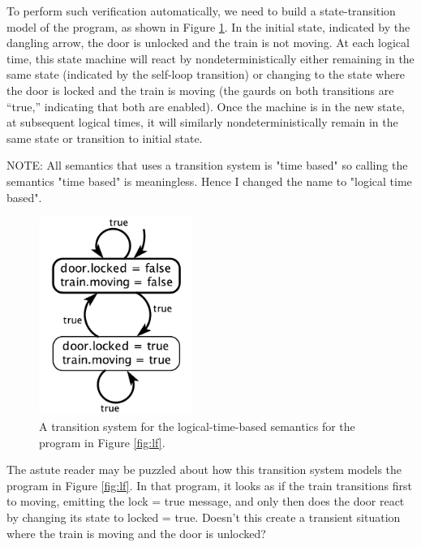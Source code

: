 \documentclass{article}
\begin{document}
To perform such verification automatically, we need to build a state-transition model
of the program, as shown in Figure \ref{fig:logicaltimebased}.
In the initial state, indicated by the dangling arrow, the door is unlocked and the train
is not moving.
At each logical time, this state machine will react by nondeterministically either
remaining in the same state (indicated by the self-loop transition) or changing to the state
where the door is locked and the train is moving
(the gaurds on both transitions are ``true,'' indicating that both are enabled).
Once the machine is in the new state, at subsequent logical times,
it will similarly nondeterministically remain in the same
state or transition to initial state.

NOTE: All semantics that uses a transition system is "time based" so calling the semantics "time based" is meaningless. Hence I changed the name to "logical time based".

\begin{figure}[b]
  \centering
  \includegraphics[width=5cm]{LogicalTimeBased.pdf}
  \caption{A transition system for the logical-time-based semantics for the program in Figure \ref{fig:lf}.
  \label{fig:logicaltimebased}}
\end{figure}

The astute reader may be puzzled about how this transition system models the program
in Figure \ref{fig:lf}. In that program, it looks as if the train transitions first to moving,
emitting the lock = true message, and only then does the door react by changing its state to
locked = true. Doesn't this create a transient situation where the train is moving
and the door is unlocked?
\end{document}
